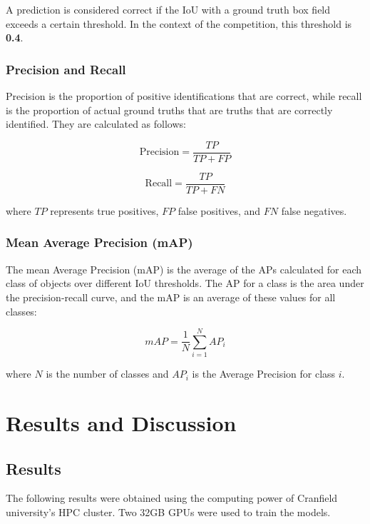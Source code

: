 \documentclass[12pt,oneside]{book} %
\begin{document}
A prediction is considered correct if the IoU with a ground truth box field
exceeds a certain threshold. In the context of the competition, this threshold
is \textbf{0.4}.

\subsection{Precision and Recall}

Precision is the proportion of positive identifications that are correct, while
recall is the proportion of actual ground truths that are truths that are
correctly identified. They are calculated as follows:

\begin{equation}
    \text{Precision} = \frac{TP}{TP + FP}
\end{equation}

\begin{equation}
    \text{Recall} = \frac{TP}{TP + FN}
\end{equation}

where $TP$ represents true positives, $FP$ false positives, and $FN$ false
negatives.

\subsection{Mean Average Precision (mAP)}

The mean Average Precision (mAP) is the average of the APs calculated for each
class of objects over different IoU thresholds. The AP for a class is the area
under the precision-recall curve, and the mAP is an average of these values for
all classes:

\begin{equation}
    mAP = \frac{1}{N} \sum_{i=1}^{N} AP_i
\end{equation}

where $N$ is the number of classes and $AP_i$ is the Average Precision for
class $i$.

\chapter{Results and Discussion}
\section{Results}

The following results were obtained using the computing power of Cranfield
university's HPC cluster. Two 32GB GPUs were used to train the models.
\end{document}
